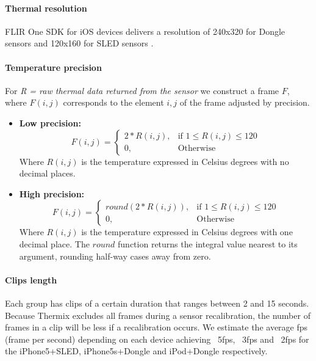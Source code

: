 \documentclass[oneside, twocolumn]{article}
\begin{document}
\paragraph{Thermal resolution}
FLIR One SDK for iOS devices delivers a resolution of 240x320 for Dongle sensors and 120x160 for
SLED sensors \cite{flir_sdk}.

\paragraph{Temperature precision}
	For \textit{R = raw thermal data returned from the sensor} we construct a frame $F$, where $F(i,j)$ corresponds
  to the element $i,j$ of the frame adjusted by precision.

	\begin{itemize}
		\item \textbf{Low precision:}
			\[
			    F(i,j)=
			\begin{cases}
			    2 * R(i,j),		& \text{if } 1 \leq R(i,j) \leq 120\\
			    0,              & \text{Otherwise}
			\end{cases}
			\]
			Where $R(i,j)$ is the temperature expressed in Celsius degrees with no decimal places.\\


		\item \textbf{High precision:}
			\[
			    F(i,j)=
			\begin{cases}
			    round(2 * R(i,j)),		& \text{if } 1 \leq R(i,j) \leq 120\\
			    0,              & \text{Otherwise}
			\end{cases}
			\]
			Where $R(i,j)$ is the temperature expressed in Celsius degrees with one decimal place. The $round$
      function returns the integral value nearest to its argument, rounding half-way cases away from zero.
	\end{itemize}

\paragraph{Clips length}
Each group has clips of a certain duration that ranges between 2 and 15 seconds. Because Thermix excludes all frames
during a sensor recalibration, the number of frames in a clip will be less if a recalibration occurs. We estimate the average fps (frame per second)
depending on each device achieving ~5fps, ~3fps and ~2fps for the iPhone5+SLED, iPhone5s+Dongle and iPod+Dongle respectively.
\end{document}
